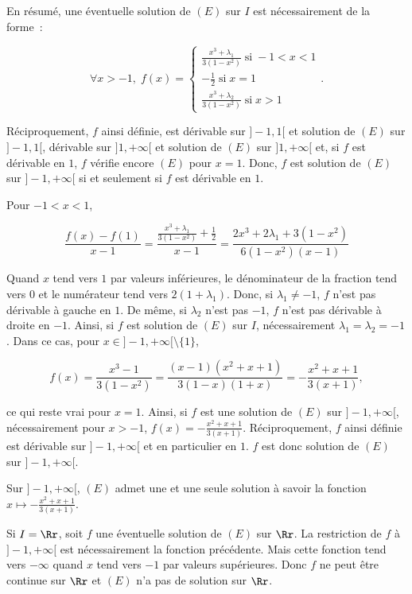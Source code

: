 {{En résumé, une éventuelle solution de $(E)$ sur $I$ est nécessairement de la forme~:

$$\forall x>-1,\;f(x)=\left\{
\begin{array}{l}
\frac{x^3+\lambda_1}{3(1-x^2)}\;\mbox{si}\;-1<x<1\\
-\frac{1}{2}\;\mbox{si}\;x=1\\
\frac{x^3+\lambda_2}{3(1-x^2)}\;\mbox{si}\;x>1
\end{array}
\right..$$

Réciproquement, $f$ ainsi définie, est dérivable sur $]-1,1[$ et solution de $(E)$ sur $]-1,1[$, dérivable sur
$]1,+\infty[$ et solution de $(E)$ sur $]1,+\infty[$ et, si $f$ est dérivable en $1$, $f$ vérifie encore $(E)$ pour
$x=1$. Donc, $f$ est solution de $(E)$ sur $]-1,+\infty[$ si et seulement si $f$ est dérivable en $1$.

Pour $-1<x<1$,

$$\frac{f(x)-f(1)}{x-1}=\frac{\frac{x^3+\lambda_1}{3(1-x^2)}+\frac{1}{2}}{x-1}=\frac{2x^3+2\lambda_1+3(1-x^2)}
{6(1-x^2)(x-1)}$$

Quand $x$ tend vers $1$ par valeurs inférieures, le dénominateur de la fraction tend vers $0$ et le numérateur tend vers
$2(1+\lambda_1)$. Donc, si $\lambda_1\neq-1$, $f$ n'est pas dérivable à gauche en $1$. De même, si $\lambda_2$ n'est pas
$-1$, $f$ n'est pas dérivable à droite en $-1$. Ainsi, si $f$ est solution de $(E)$ sur $I$, nécessairement
$\lambda_1=\lambda_2=-1$. Dans ce cas, pour $x\in]-1,+\infty[\setminus\{1\}$,

$$f(x)=\frac{x^3-1}{3(1-x^2)}=\frac{(x-1)(x^2+x+1)}{3(1-x)(1+x)}=-\frac{x^2+x+1}{3(x+1)},$$

ce qui reste vrai pour $x=1$. Ainsi, si $f$ est une solution de $(E)$ sur $]-1,+\infty[$, nécessairement
pour $x>-1$, $f(x)=-\frac{x^2+x+1}{3(x+1)}$. Réciproquement, $f$ ainsi définie est dérivable sur $]-1,+\infty[$ et en
particulier en $1$. $f$ est donc solution de $(E)$ sur $]-1,+\infty[$.

Sur $]-1,+\infty[$, $(E)$ admet une et une seule solution à savoir la fonction $x\mapsto-\frac{x^2+x+1}{3(x+1)}$.

Si $I=\Rr$, soit $f$ une éventuelle solution de $(E)$ sur $\Rr$. La restriction de $f$ à $]-1,+\infty[$ est
nécessairement la fonction précédente. Mais cette fonction tend vers $-\infty$ quand $x$ tend vers $-1$ par valeurs
supérieures. Donc $f$ ne peut être continue sur $\Rr$ et $(E)$ n'a pas de solution sur $\Rr$.
}
}
